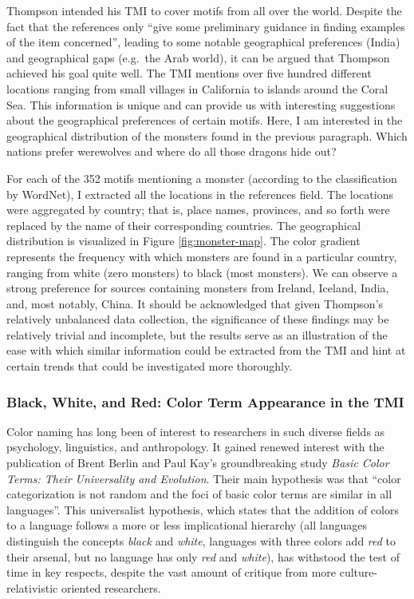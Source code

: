 Thompson intended his TMI to cover motifs from all over the world. Despite the fact that the references only ``give some preliminary guidance in finding examples of the item concerned''\autocite[24]{thompson:1955}, leading to some notable geographical preferences (India) and geographical gaps (e.g.\ the Arab world)\autocite[see for commentary and resolution][]{el-shamy:1980,el-shamy:1995}, it can be argued that Thompson achieved his goal quite well. The TMI mentions over five hundred different locations ranging from small villages in California to islands around the Coral Sea. This information is unique and can provide us with interesting suggestions about the geographical preferences of certain motifs. Here, I am interested in the geographical distribution of the monsters found in the previous paragraph. Which nations prefer werewolves and where do all those dragons hide out?

For each of the 352 motifs mentioning a monster (according to the classification by WordNet), I extracted all the locations in the references field. The locations were aggregated by country; that is, place names, provinces, and so forth were replaced by the name of their corresponding countries. The geographical distribution is visualized in Figure \ref{fig:monster-map}. The color gradient represents the frequency with which monsters are found in a particular country, ranging from white (zero monsters) to black (most monsters). We can observe a strong preference for sources containing monsters from Ireland, Iceland, India, and, most notably, China. It should be acknowledged that given Thompson's relatively unbalanced data collection, the significance of these findings may be relatively trivial and incomplete, but the results serve as an illustration of the ease with which similar information could be extracted from the TMI and hint at certain trends that could be investigated more thoroughly.

\subsubsection{Black, White, and Red: Color Term Appearance in the TMI}

Color naming has long been of interest to researchers in such diverse fields as psychology, linguistics, and anthropology. It gained renewed interest with the publication of Brent Berlin and Paul Kay's groundbreaking study \emph{Basic Color Terms: Their Universality and Evolution}.\autocite{berlin:1969} Their main hypothesis was that ``color categorization is not random and the foci of basic color terms are similar in all languages''\autocite[10]{berlin:1969}. This universalist hypothesis, which states that the addition of colors to a language follows a more or less implicational hierarchy (all languages distinguish the concepts \emph{black} and \emph{white}, languages with three colors add \emph{red} to their arsenal, but no language has only \emph{red} and \emph{white}), has withstood the test of time in key respects, despite the vast amount of critique from more culture-relativistic oriented researchers.

